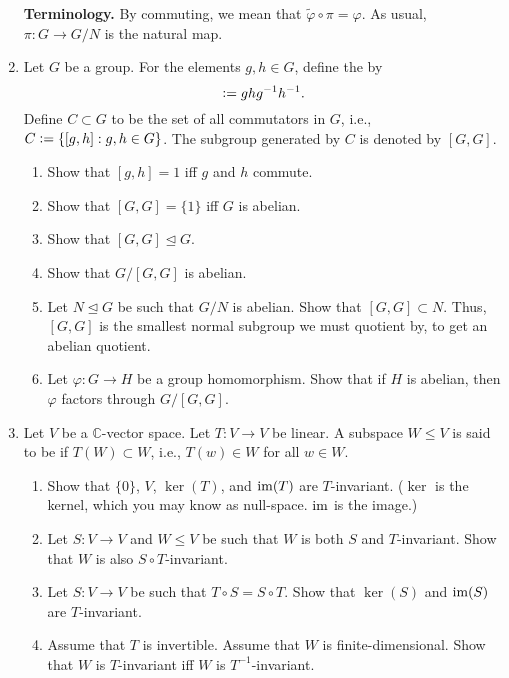 \documentclass[12pt]{article}
\begin{document}
\begin{enumerate}
	\textbf{Terminology.} By  commuting, we mean that $\widetilde{\varphi} \circ \pi = \varphi$. As usual, $\pi : G \to G/N$ is the natural map.
	\item Let $G$ be a group. For the elements $g, h \in G$, define the  by
	\begin{equation*} 
		[g, h] \vcentcolon= ghg^{-1}h^{-1}.
	\end{equation*} 
	Define $C \subset G$ to be the set of all commutators in $G$, i.e., $C \vcentcolon= \{[g, h] : g, h \in G\}$. The subgroup generated by $C$ is denoted by $[G, G]$. 
	\begin{enumerate}
		\item Show that $[g, h] = 1$ iff $g$ and $h$ commute. 
		\item Show that $[G, G] = \{1\}$ iff $G$ is abelian.
		\item Show that $[G, G] \unlhd G$.
		\item Show that $G/[G, G]$ is abelian.
		\item Let $N \unlhd G$ be such that $G/N$ is abelian. Show that $[G, G] \subset N$. Thus, $[G, G]$ is the smallest normal subgroup we must quotient by, to get an abelian quotient.
		\item Let $\varphi : G \to H$ be a group homomorphism. Show that if $H$ is abelian, then $\varphi$ factors through $G/[G, G]$.
	\end{enumerate}
	\item Let $V$ be a $\mathbb{C}$-vector space. Let $T : V \to V$ be linear. A subspace $W \le V$ is said to be  if $T(W) \subset W$, i.e., $T(w) \in W$ for all $w \in W$.
	\begin{enumerate}
		\item Show that $\{0\}$, $V$, $\ker(T)$, and $\operatorname{im}(T)$ are $T$-invariant. ($\ker$ is the kernel, which you may know as null-space. $\operatorname{im}$ is the image.)
		\item Let $S : V \to V$ and $W \le V$ be such that $W$ is both $S$ and $T$-invariant. Show that $W$ is also $S \circ T$-invariant.
		\item Let $S : V \to V$ be such that $T \circ S = S \circ T$. {\color{red}Show that $\ker(S)$ and $\operatorname{im}(S)$ are $T$-invariant.} %
		\item Assume that $T$ is invertible. {\color{red}Assume that $W$ is finite-dimensional.} Show that $W$ is $T$-invariant iff $W$ is $T^{-1}$-invariant. \\

\end{enumerate}
\end{enumerate}
\end{document}
